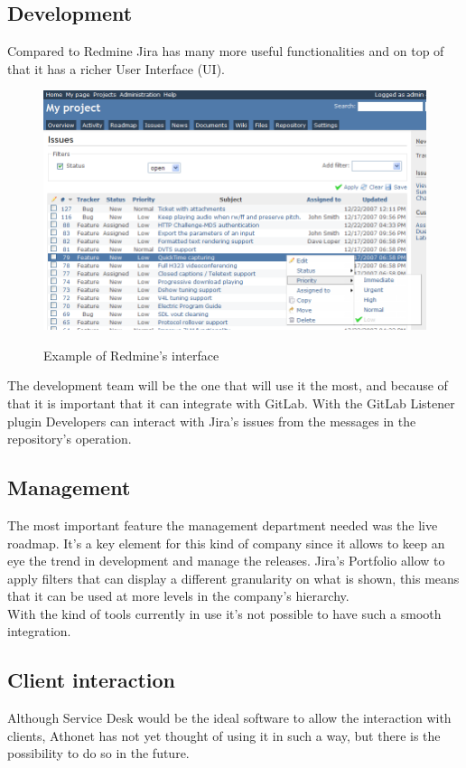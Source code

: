 	\subsection{Development} 
		Compared to Redmine Jira has many more useful functionalities and on top of that it has a richer User Interface (UI).
		\begin{figure}[H]
			\centering
			\includegraphics[width=\textwidth]{resources/redmine_screennn}\\
			\caption{Example of Redmine's interface}
		\end{figure}
		The development team will be the one that will use it the most, and because of that it is important that it can integrate with GitLab.
		With the GitLab Listener plugin \cite{gitlab-listener} Developers can interact with Jira's issues from the messages in the repository's operation.
	
	\subsection{Management} 
		The most important feature the management department needed was the live roadmap.	
		It's a key element for this kind of company since it allows to keep an eye the trend in development and manage the releases.
		Jira's Portfolio allow to apply filters that can display a different granularity on what is shown, this means that it can be used at more levels in the company's hierarchy.\\
		With the kind of tools currently in use it's not possible to have such a smooth integration.
	
	\subsection{Client interaction} 
		Although Service Desk would be the ideal software to allow the interaction with clients, Athonet has not yet thought of using it in such a way, but there is the possibility to do so in the future.
		
